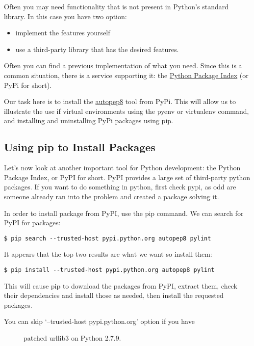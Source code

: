 Often you may need functionality that is not present in Python's
standard library. In this case you have two option:

\begin{itemize}
\tightlist
\item
  implement the features yourself
\item
  use a third-party library that has the desired features.
\end{itemize}

Often you can find a previous implementation of what you need. Since
this is a common situation, there is a service supporting it: the
\href{https://pypi.python.org/pypi}{Python Package Index} (or PyPi for
short).

Our task here is to install the \href{}{autopep8} tool from PyPi. This
will allow us to illustrate the use if virtual environments using the
pyenv or virtualenv command, and installing and uninstalling PyPi
packages using pip.

\subsection{Using pip to Install
Packages}\label{using-pip-to-install-packages}

Let's now look at another important tool for Python development: the
Python Package Index, or PyPI for short. PyPI provides a large set of
third-party python packages. If you want to do something in python,
first check pypi, as odd are someone already ran into the problem and
created a package solving it.

In order to install package from PyPI, use the pip command. We can
search for PyPI for packages:

\begin{verbatim}
$ pip search --trusted-host pypi.python.org autopep8 pylint
\end{verbatim}

It appears that the top two results are what we want so install them:

\begin{verbatim}
$ pip install --trusted-host pypi.python.org autopep8 pylint
\end{verbatim}

This will cause pip to download the packages from PyPI, extract them,
check their dependencies and install those as needed, then install the
requested packages.

\begin{description}
\item[You can skip `--trusted-host pypi.python.org' option if you have]
patched urllib3 on Python 2.7.9.
\end{description}

